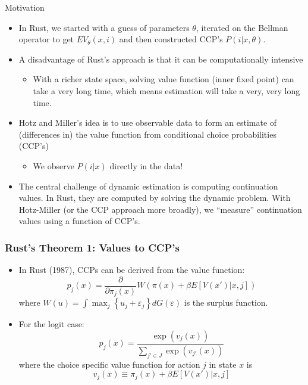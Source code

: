 \documentclass[xcolor=pdftex,dvipsnames,table,mathserif]{beamer}
\begin{document}
\begin{frame}{Motivation}
\begin{itemize}
	\item In Rust, we started with a guess of parameters $\theta$, iterated on the Bellman operator to get $EV_{\theta}(x,i)$ and then constructed CCP's $P(i | x, \theta)$.
	\item A disadvantage of Rust's approach is that it can be computationally intensive
	\begin{itemize}
	
		\item With a richer state space, solving value function (inner fixed point) 
		can take a very long time,
		which means estimation will take a very, very long time.
	\end{itemize}
	\item Hotz and Miller's idea is to use observable data to form an estimate 
	of (differences in) the value function from conditional choice probabilities (CCP's)
\begin{itemize}
\item We observe $P(i | x)$ directly in the data!
\end{itemize}
	
	\item The central challenge of dynamic estimation is computing continuation values. 
	In Rust, they are computed by solving the dynamic problem.
	With Hotz-Miller (or the CCP approach more broadly), we ``measure'' continuation
	values using a function of CCP's.
	
\end{itemize}
\end{frame}

\begin{frame}
\frametitle{Rust's Theorem 1: Values to CCP's}
\begin{itemize}
	\item In Rust (1987), CCPs can be derived from the value function:\[
		p_{j}\left( x\right) = \frac{\partial}{\partial \pi_{j} \left(x \right)} W\left( \pi\left( x \right) 
		+\beta E\left[V\left(x' \right)|x,j\right]\right)
	\]
	where  $W\left(u\right) = \int \max_{j} \left\{ u_{j} +\varepsilon_{j}\right\}dG\left( \varepsilon\right)$ is the surplus function.

	\medskip
	\item For the logit case:\[
	p_{j}\left(x\right) = \frac{\exp\left(v_{j}\left(x\right)\right)}{\sum_{j'\in J}\exp\left(v_{j'}\left(x\right)\right)}
	\]
	where the choice specific value function for action $j$ in state $x$ is \[
	v_{j}\left(x\right) \equiv \pi_{j}\left(x\right)+\beta E\left[V\left(x' \right)|x,j\right]
	\]
\end{itemize}
\end{frame}
\end{document}

